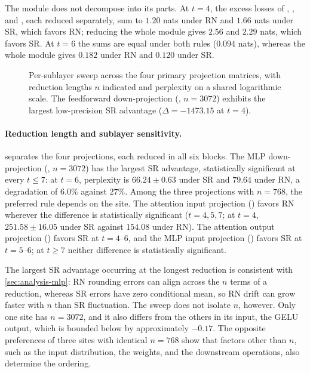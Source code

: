 The  module does not decompose into its parts. At $t=4$, the
excess losses of , , and
, each reduced separately, sum to $1.20$ nats under RN and
$1.66$ nats under SR, which favors RN; reducing the whole module gives $2.56$
and $2.29$ nats, which favors SR. At $t=6$ the sums are equal under both rules
($0.094$ nats), whereas the whole module gives $0.182$ under RN and $0.120$
under SR.

\begin{figure}[t]
  \centering
  \caption{Per-sublayer sweep across the four primary projection matrices, with
    reduction lengths $n$ indicated and perplexity on a shared logarithmic scale.
    The feedforward down-projection (, $n=3072$) exhibits the
    largest low-precision SR advantage ($\Delta = -1473.15$ at $t=4$).}
  \label{fig:sublayer}
\end{figure}

\paragraph{Reduction length and sublayer sensitivity.}
 separates the four projections, each reduced in all six
blocks. The MLP down-projection (, $n=3072$) has the largest
SR advantage, statistically significant at every $t\le7$: at $t=6$, perplexity
is $66.24\pm0.63$ under SR and $79.64$ under RN, a degradation of $6.0\%$
against $27\%$. Among the three projections with $n=768$, the preferred rule
depends on the site. The attention input projection ()
favors RN wherever the difference is statistically significant ($t=4,5,7$; at
$t=4$, $251.58\pm16.05$ under SR against $154.08$ under RN). The attention
output projection () favors SR at $t=4$--$6$, and the MLP
input projection () favors SR at $t=5$--$6$; at $t\ge7$ neither
difference is statistically significant.

The largest SR advantage occurring at the longest reduction is consistent with
\cref{sec:analysis-mlp}: RN rounding errors can align across the $n$ terms of a
reduction, whereas SR errors have zero conditional mean, so RN drift can grow
faster with $n$ than SR fluctuation. The sweep does not isolate $n$, however.
Only one site has $n=3072$, and it also differs from the others in its input,
the GELU output, which is bounded below by approximately $-0.17$. The opposite
preferences of three sites with identical $n=768$ show that factors other than
$n$, such as the input distribution, the weights, and the downstream
operations, also determine the ordering.


